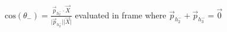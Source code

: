 \documentclass[border={2pt 1pt 2pt 1pt}]{standalone}
\begin{document}
$\mathrm{cos}(\theta_-) = \frac{\vec{p}_{h_2^-}\cdot\vec{X}}{\lvert\vec{p}_{h_2^-}\rvert\lvert\vec{X}\rvert}$ \quad
evaluated in frame where $\vec{p}_{h_2^-} + \vec{p}_{h_3^-} = \vec{0}$
\end{document}
